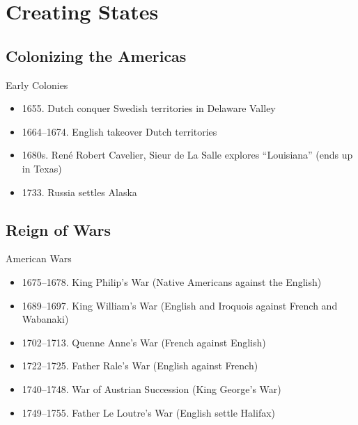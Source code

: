 


\section{Creating States}
\subsection{Colonizing the Americas}
\begin{frame}{Early Colonies}
	\begin{itemize}
		\item<9-11,13->1655. Dutch conquer Swedish territories in Delaware Valley
		\item<10-11,13->1664--1674. English takeover Dutch territories
		\item<11,13-> 1680s. Ren{\'e} Robert Cavelier, Sieur de La Salle explores ``Louisiana'' (ends up in Texas)
		\item<13->1733. Russia settles Alaska
	\end{itemize}
\end{frame}

\subsection{Reign of Wars}
\begin{frame}{American Wars}
	\begin{itemize}
		\item<1-6>1675--1678. King Philip's War (Native Americans against the English)
		\item<2-6>1689--1697. King William's War (English and Iroquois against French and Wabanaki)
		\item<3-6>1702--1713. Quenne Anne's War (French against English)
		\item<4-6>1722--1725. Father Rale's War (English against French)
		\item<5-6>1740--1748. War of Austrian Succession (King George's War)
		\item<6>1749--1755. Father Le Loutre's War (English settle Halifax)
	\end{itemize}
\end{frame}

